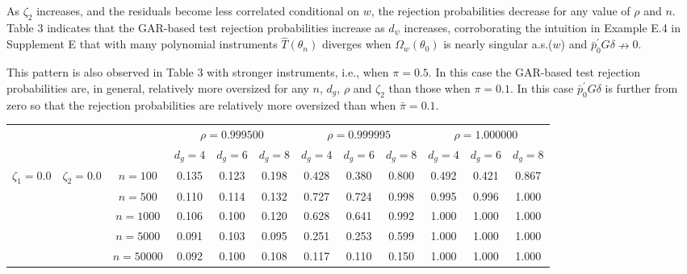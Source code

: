 \documentclass[hidelinks, 11 pt, a4paper, pdflatex]{article}
\begin{document}
{  As $\zeta_2$ increases, and the residuals become less correlated conditional on $w$, the rejection probabilities decrease for any value of $\rho$ and $n$. Table 3 indicates that the GAR-based test rejection probabilities increase as $d_{\psi}$ increases, corroborating the intuition in Example E.4 in Supplement E that with many polynomial instruments $\hat{T}(\theta_n)$ diverges when $\Omega_w(\theta_0)$ is nearly singular a.s.($w$) and $\bar{p}_{0}^{\prime}G\delta \nrightarrow 0$.
				
  This pattern is also observed in Table 3 with stronger instruments, i.e., when $\pi = 0.5$. In this case the GAR-based test rejection probabilities are, in general, relatively more oversized for any $n$, $d_g$, $\rho$ and $\zeta_2$ than those when $\pi = 0.1$. In this case $\bar{p}_{0}^{\prime}G\delta$ is further from zero so that the rejection probabilities are relatively more oversized than when $\bar{\pi} = 0.1$.

  \begin{landscape}					
   \begin{table}[h]							
	\begin{center}
	 \begin{tabular}[t]{cccccccccccc}

      \hline
      \hline

	  \multicolumn{3}{c}{} & \multicolumn{3}{c}{$\rho=0.999500$} & \multicolumn{3}{c}{$\rho=0.999995$} & \multicolumn{3}{c}{$\rho=1.000000$}  \\
	  \multicolumn{3}{c}{} & \multicolumn{1}{c}{$d_g=4$} & \multicolumn{1}{c}{$d_g=6$} & \multicolumn{1}{c}{$d_g=8$} & \multicolumn{1}{c}{$d_g=4$} & \multicolumn{1}{c}{$d_g=6$} &
               \multicolumn{1}{c}{$d_g=8$} & \multicolumn{1}{c}{$d_g=4$} & \multicolumn{1}{c}{$d_g=6$} & \multicolumn{1}{c}{$d_g=8$}   \\

      \hline
      \hline
      $\zeta_1=0.0$ & $\zeta_2=0.0$ & $n=100$   & 0.135 & 0.123 & 0.198 & 0.428 & 0.380 & 0.800 & 0.492 & 0.421 & 0.867  \\ [0.3cm]
                    &               & $n=500$   & 0.110 & 0.114 & 0.132 & 0.727 & 0.724 & 0.998 & 0.995 & 0.996 & 1.000  \\ [0.3cm]
                    &               & $n=1000$  & 0.106 & 0.100 & 0.120 & 0.628 & 0.641 & 0.992 & 1.000 & 1.000 & 1.000  \\ [0.3cm]
                    &               & $n=5000$  & 0.091 & 0.103 & 0.095 & 0.251 & 0.253 & 0.599 & 1.000 & 1.000 & 1.000  \\ [0.3cm]
                    &               & $n=50000$ & 0.092 & 0.100 & 0.108 & 0.117 & 0.110 & 0.150 & 1.000 & 1.000 & 1.000  \\ [0.3cm]
									

\end{tabular}
\end{center}
\end{table}
\end{landscape}}
\end{document}
